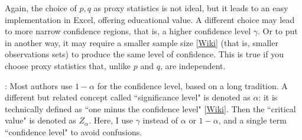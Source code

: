 \documentclass[10pt]{article}
\begin{document}
Again, the choice of $p,q$ as proxy statistics is not ideal, but it leads to an easy implementation in Excel, offering educational value. A different choice may lead to more narrow confidence regions, that is, a higher confidence level $\gamma$. Or to put in another way, it may require a smaller
\textcolor{index}{sample size} [\href{https://en.wikipedia.org/wiki/Sample_size_determination}{Wiki}] (that is, smaller observations sets) to produce the same level of confidence. This is true if you choose proxy statistics that, unlike $p$ and $q$, are independent.

: Most authors use $1-\alpha$ for the \textcolor{index}{confidence level}, based on a long tradition.
A different but related concept called ``significance level" is denoted as  $\alpha$: it is technically defined as
``one minus the confidence level" [\href{https://statisticsbyjim.com/hypothesis-testing/critical-value/}{Wiki}].
Then the ``critical value" is denoted as $Z_\alpha$. Here, I use $\gamma$ instead of $\alpha$ or $1-\alpha$, and a single term ``confidence level" to avoid confusions.

\quad \\
\end{document}
